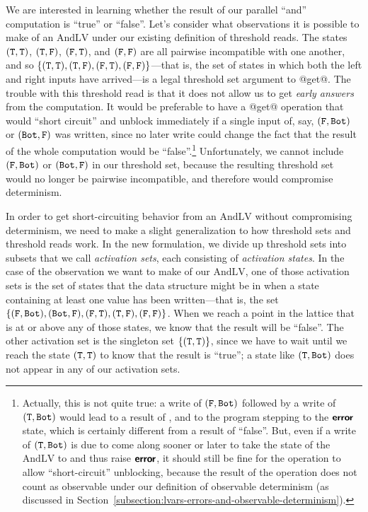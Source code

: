 We are interested in learning whether the result of our parallel
``and'' computation is ``true'' or ``false''.  Let's consider what
observations it is possible to make of an $\mathrm{AndLV}$ under our
existing definition of threshold reads.  The states $(\texttt{T},\texttt{T})$,
$(\texttt{T},\texttt{F})$, $(\texttt{F},\texttt{T})$, and $(\texttt{F},\texttt{F})$ are all pairwise
incompatible with one another, and so $\left\{ (\texttt{T},\texttt{T}),
  (\texttt{T},\texttt{F}), (\texttt{F},\texttt{T}), (\texttt{F},\texttt{F}) \right\}$---that is, the set of
states in which both the left and right inputs have arrived---is a
legal threshold set argument to @get@.  The trouble with this
threshold read is that it does not allow us to get \emph{early
  answers} from the computation.  It would be preferable to have a
@get@ operation that would ``short circuit'' and unblock immediately
if a single input of, say, $(\texttt{F},\texttt{Bot})$ or $(\texttt{Bot},\texttt{F})$ was
written, since no later write could change the fact that the result of
the whole computation would be ``false''.\footnote{Actually, this is
  not quite true: a write of $(\texttt{F},\texttt{Bot})$ followed by a write of
  $(\texttt{T},\texttt{Bot})$ would lead to a result of , and to the
  program stepping to the $\textbf{\textsf{error}}$ state, which is certainly different
  from a result of ``false''.  But, even if a write of
  $(\texttt{T},\texttt{Bot})$ is due to come along sooner or later to take the
  state of the $\mathrm{AndLV}$ to  and thus raise $\textbf{\textsf{error}}$,
  it should still be fine for the  operation to allow
  ``short-circuit'' unblocking, because the result of the 
  operation does not count as observable under our definition of
  observable determinism (as discussed in
  Section~\ref{subsection:lvars-errors-and-observable-determinism}).}
Unfortunately, we cannot include $(\texttt{F},\texttt{Bot})$ or $(\texttt{Bot},\texttt{F})$
in our threshold set, because the resulting threshold set would no
longer be pairwise incompatible, and therefore would compromise
determinism.

In order to get short-circuiting behavior from an $\mathrm{AndLV}$
without compromising determinism, we need to make a slight
generalization to how threshold sets and threshold reads work.  In the
new formulation, we divide up threshold sets into subsets that we call
\emph{activation sets}, each consisting of \emph{activation states}.
In the case of the observation we want to make of our
$\mathrm{AndLV}$, one of those activation sets is the set of states
that the data structure might be in when a state containing at least
one  value has been written---that is, the set $\left\{
  (\texttt{F},\texttt{Bot}), (\texttt{Bot},\texttt{F}), (\texttt{F},\texttt{T}), (\texttt{T},\texttt{F}),
  (\texttt{F},\texttt{F}) \right\}$.  When we reach a point in the lattice that is at or
above any of those states, we know that the result will be ``false''.
The other activation set is the singleton set $\left\{ (\texttt{T},\texttt{T})
\right\}$, since we have to wait until we reach the state $(\texttt{T},\texttt{T})$ to
know that the result is ``true''; a state like $(\texttt{T},\texttt{Bot})$ does
not appear in any of our activation sets.

